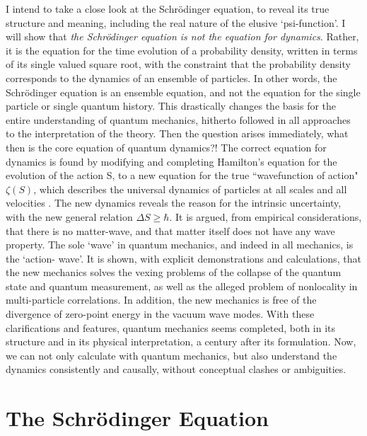 I intend to take a close look at the Schr\"{o}dinger equation, to reveal its true structure
and meaning, including the real nature of the elusive `psi-function'. I will show that \textit{the
Schr\"{o}dinger equation is not the equation for dynamics}. Rather, it is the equation for the
time evolution of a probability density, written in terms of its single valued square root, with
the constraint that the probability density corresponds to the dynamics of an ensemble of
particles. In other words, the Schr\"{o}dinger equation is an ensemble equation, and not the
equation for the single particle or single quantum history. This drastically changes the basis
for the entire understanding of quantum mechanics, hitherto followed in all approaches
to the interpretation of the theory. Then the question arises immediately, what then is
the core equation of quantum dynamics?! The correct equation for dynamics is found by
modifying and completing Hamilton's equation for the evolution of the action S, to a new
equation for the true ``wavefunction of action" $\zeta(S)$, which describes the universal dynamics
of particles at all scales and all velocities \cite{chap14-key2}. The new dynamics reveals the reason for the
intrinsic uncertainty, with the new general relation $\Delta S\geq\hbar$. It is argued, from empirical
considerations, that there is no matter-wave, and that matter itself does not have any wave
property. The sole `wave' in quantum mechanics, and indeed in all mechanics, is the `action-
wave'. It is shown, with explicit demonstrations and calculations, that the new mechanics
solves the vexing problems of the collapse of the quantum state and quantum measurement,
as well as the alleged problem of nonlocality in multi-particle correlations. In addition, the
new mechanics is free of the divergence of zero-point energy in the vacuum wave modes.
With these clarifications and features, quantum mechanics seems completed, both in its
structure and in its physical interpretation, a century after its formulation. Now, we can
not only calculate with quantum mechanics, but also understand the dynamics consistently
and causally, without conceptual clashes or ambiguities.

\section{The Schr\"{o}dinger Equation}\label{c14-sec2}

